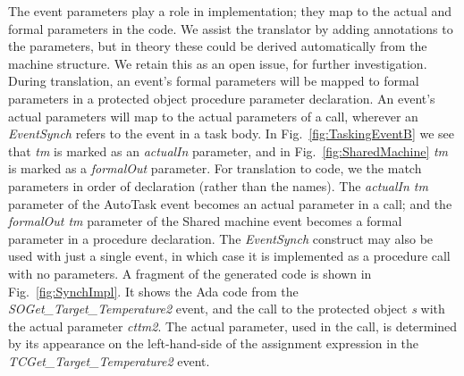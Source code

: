 The event parameters play a role in implementation; they map to the actual and formal parameters in the code. We assist the translator by adding annotations to the parameters, but in theory these could be derived automatically from the machine structure. We retain this as an open issue, for further investigation. During translation, an event's formal parameters will be mapped to formal parameters in a protected object procedure parameter declaration. An event's actual parameters will map to the actual parameters of a call, wherever an \emph{EventSynch} refers to the event in a task body. In Fig.~\ref{fig:TaskingEventB} we see that \emph{tm} is marked as an \emph{actualIn} parameter, and in Fig.~\ref{fig:SharedMachine} \emph{tm} is marked as a \emph{formalOut} parameter. For translation to code, we the match parameters in order of declaration (rather than the names). The \emph{actualIn tm} parameter of the AutoTask event becomes an actual parameter in a call;  and the \emph{formalOut tm} parameter of the Shared machine event becomes a formal parameter in a procedure declaration. The \emph{EventSynch} construct may also be used with just a single event, in which case it is implemented as a procedure call with no parameters. A fragment of the generated code is shown in Fig.~\ref{fig:SynchImpl}. It shows the Ada code from the \emph{SOGet\_Target\_Temperature2} event, and the call to the protected object \emph{s} with the actual parameter \emph{cttm2}. The actual parameter, used in the call, is determined by its appearance on the left-hand-side of the assignment expression in the \emph{TCGet\_Target\_Temperature2} event. 
%
